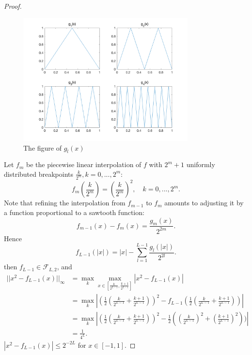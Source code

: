 \begin{proof}
\begin{figure}[h]
	\includegraphics[width=0.8\textwidth]{figures/dl_approx_analytic_gl}
	\caption{The figure of $g_l(x)$}
	\label{fig:gl}
\end{figure}

Let $f_m$ be the piecewise linear interpolation of $f$ with $2^m+1$ uniformly distributed breakpoints $\frac{k}{2^m},k = 0,...,2^m:$
$$
f_{m}(\frac{k}{2^m}) = (\frac{k}{2^m})^2,\quad k = 0,...,2^m.
$$
Note that refining the interpolation from $f_{m-1}$ to $f_m$ amounts to adjusting it by a function proportional to a sawtooth function:
$$
f_{m-1}(x) - f_m(x) = \frac{g_m(x)}{2^{2m}}.
$$
Hence 
$$
f_{L-1}(|x|) = |x| - \sum_{l=1}^{L-1}\frac{g_l(|x|)}{2^{2l}} .
$$
then $f_{L-1}\in \mathcal{F}_{L,2}$, and 
\[
\begin{split}
||x^2-f_{L-1}(x)||_{\infty} & = \max_{k} \max_{x\in [\frac{k}{2^{L-1}},\frac{k+1}{2^{L-1}}]} |x^2 - f_{L-1}(x)|\\
  & = \max_{k} |(\frac{1}{2}(\frac{k}{2^{L-1}}+\frac{k+1}{2^{L-1}}))^2 - f_{L-1}(\frac{1}{2}(\frac{k}{2^{L-1}}+\frac{k+1}{2^{L-1}}))|\\
  & = \max_k |(\frac{1}{2}(\frac{k}{2^{L-1}}+\frac{k+1}{2^{L-1}}))^2 - \frac{1}{2}((\frac{k}{2^{L-1}})^2+(\frac{k+1}{2^{L-1}})^2))|\\
  &=\frac{1}{4^L}.
\end{split}
\]
$|x^2-f_{L-1}(x)|\le 2^{-2L}$ for $x\in[-1,1].$
\end{proof}


